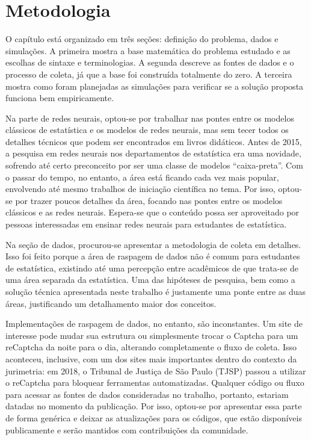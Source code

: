 \documentclass[12pt,twoside,brazilian]{book}
\begin{document}

\hypertarget{sec-metodologia}{%
\chapter{Metodologia}\label{sec-metodologia}}


O capítulo está organizado em três seções: definição do problema, dados
e simulações. A primeira mostra a base matemática do problema estudado e
as escolhas de sintaxe e terminologias. A segunda descreve as fontes de
dados e o processo de coleta, já que a base foi construída totalmente do
zero. A terceira mostra como foram planejadas as simulações para
verificar se a solução proposta funciona bem empiricamente.

Na parte de redes neurais, optou-se por trabalhar nas pontes entre os
modelos clássicos de estatística e os modelos de redes neurais, mas sem
tecer todos os detalhes técnicos que podem ser encontrados em livros
didáticos. Antes de 2015, a pesquisa em redes neurais nos departamentos
de estatística era uma novidade, sofrendo até certo preconceito por ser
uma classe de modelos ``caixa-preta''. Com o passar do tempo, no
entanto, a área está ficando cada vez mais popular, envolvendo até mesmo
trabalhos de iniciação científica no tema. Por isso, optou-se por trazer
poucos detalhes da área, focando nas pontes entre os modelos clássicos e
as redes neurais. Espera-se que o conteúdo possa ser aproveitado por
pessoas interessadas em ensinar redes neurais para estudantes de
estatística.

Na seção de dados, procurou-se apresentar a metodologia de coleta em
detalhes. Isso foi feito porque a área de raspagem de dados não é comum
para estudantes de estatística, existindo até uma percepção entre
acadêmicos de que trata-se de uma área separada da estatística. Uma das
hipóteses de pesquisa, bem como a solução técnica apresentada neste
trabalho é justamente uma ponte entre as duas áreas, justificando um
detalhamento maior dos conceitos.

Implementações de raspagem de dados, no entanto, são inconstantes. Um
site de interesse pode mudar sua estrutura ou simplesmente trocar o
Captcha para um reCaptcha da noite para o dia, alterando completamente o
fluxo de coleta. Isso aconteceu, inclusive, com um dos sites mais
importantes dentro do contexto da jurimetria: em 2018, o Tribunal de
Justiça de São Paulo (TJSP) passou a utilizar o reCaptcha para bloquear
ferramentas automatizadas. Qualquer código ou fluxo para acessar as
fontes de dados consideradas no trabalho, portanto, estariam datadas no
momento da publicação. Por isso, optou-se por apresentar essa parte de
forma genérica e deixar as atualizações para os códigos, que estão
disponíveis publicamente e serão mantidos com contribuições da
comunidade.
\end{document}
